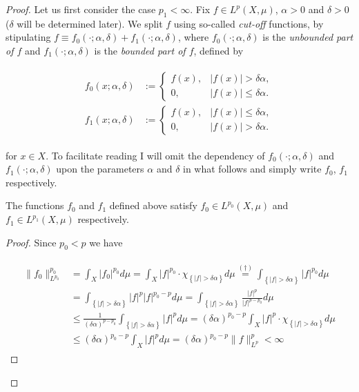 \begin{proof}
Let us first consider the case \underline{$p_1 < \infty$}. Fix $f \in L^p(X,\mu)$, $\alpha > 0$ and $\delta > 0$ ($\delta$ will be determined later). We split $f$ using so-called \emph{cut-off} functions, by stipulating $f \equiv f_0(\cdot;\alpha,\delta) + f_1(\cdot;\alpha,\delta)$, where $f_0(\cdot;\alpha,\delta)$ is the \emph{unbounded part of $f$} and $f_1(\cdot;\alpha,\delta)$ is the \emph{bounded part of $f$}, defined by

\begin{gather}
	\begin{aligned}
		f_0(x;\alpha,\delta) &:= \begin{cases}
			f(x), & \vert f(x) \vert > \delta \alpha,\\
			0, & \vert f(x)\vert \leq \delta \alpha.
		\end{cases}\\
		f_1(x;\alpha,\delta) &:= \begin{cases}
			f(x), & \vert f(x) \vert \leq \delta \alpha,\\
			0, & \vert f(x)\vert > \delta \alpha.
		\end{cases}
	\end{aligned}
	\label{eq:cut_off}
\end{gather}

for $x \in X$. To facilitate reading I will omit the dependency of $f_0(\cdot;\alpha,\delta)$ and $f_1(\cdot;\alpha,\delta)$ upon the parameters $\alpha$ and $\delta$ in what follows and simply write $f_0$, $f_1$ respectively. 
	
\begin{lemma}
The functions $f_0$ and $f_1$ defined above satisfy $f_0 \in L^{p_0}(X,\mu)$ and $f_1 \in L^{p_1}(X,\mu)$ respectively.
\label{lem:f0f1}
\end{lemma}
	
\begin{proof}
Since $p_0 < p$ we have 

\begin{gather}
	\begin{aligned}
		\|f_0\|^{p_0}_{L^{p_0}} &= \int_{X} \vert f_0\vert^{p_0} d\mu =\int_{X} \vert f \vert^{p_0} \cdot \chi_{\left\{\vert f\vert > \delta\alpha \right\}} d\mu \overset{(\dagger)}{=} \int_{\left\{\vert f \vert > \delta\alpha \right\}} \vert f \vert^{p_0}d\mu\\ 
		&= \int_{\left\{\vert f\vert > \delta\alpha \right\}} \vert f \vert^p \vert f \vert^{p_0 - p} d\mu = \int_{\left\{\vert f\vert > \delta\alpha \right\}} \frac{\vert f \vert^p}{\vert f \vert^{p - p_0}} d\mu\\
		&\leq \frac{1}{(\delta\alpha)^{p - p_0}} \int_{\left\{\vert f\vert > \delta\alpha \right\}} \vert f \vert^p d\mu = (\delta\alpha)^{p_0 - p} \int_{X} \vert f \vert^p \cdot \chi_{\left\{\vert f\vert > \delta\alpha \right\}} d\mu\\
		& \leq (\delta\alpha)^{p_0 - p} \int_{X} \vert f \vert^p d\mu = (\delta\alpha)^{p_0 - p} \|f\|^p_{L^p} < \infty
	\end{aligned}
	\label{est:f0}
\end{gather}


\end{proof}
\end{proof}

